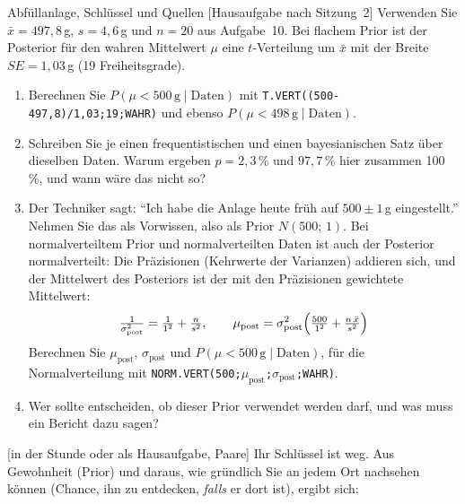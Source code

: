 \begin{uebungsblattc}{Abfüllanlage, Schlüssel und Quellen}
\newpage
{}[Hausaufgabe nach Sitzung~2]
Verwenden Sie $\bar{x}=497{,}8$\,g, $s=4{,}6$\,g und $n=20$ aus
Aufgabe~10. Bei flachem Prior ist der Posterior für den wahren
Mittelwert $\mu$ eine $t$-Verteilung um $\bar{x}$ mit der Breite
$\mathit{SE}=1{,}03$\,g (19 Freiheitsgrade).
\begin{enumerate}
  \item Berechnen Sie $P(\mu<500\,\text{g}\mid\text{Daten})$ mit
    \texttt{T.VERT((500-497,8)/1,03;19;WAHR)} und ebenso
    $P(\mu<498\,\text{g}\mid\text{Daten})$.
  \item Schreiben Sie je einen frequentistischen und einen bayesianischen
    Satz über dieselben Daten. Warum ergeben $p=2{,}3\,\%$ und
    $97{,}7\,\%$ hier zusammen 100\,\%, und wann wäre das nicht so?
  \item Der Techniker sagt: \enquote{Ich habe die Anlage heute früh
    auf $500\pm1$\,g eingestellt.} Nehmen Sie das als Vorwissen, also als
    Prior $N(500;\,1)$. Bei
    normalverteiltem Prior und normalverteilten Daten ist auch der
    Posterior normalverteilt: Die Präzisionen (Kehrwerte der Varianzen)
    addieren sich, und der Mittelwert des Posteriors ist der mit den
    Präzisionen gewichtete Mittelwert:
    \[\tfrac{1}{\sigma^2_{\text{post}}}=\tfrac{1}{1^2}+\tfrac{n}{s^2},\qquad
      \mu_{\text{post}}=\sigma^2_{\text{post}}\Bigl(\tfrac{500}{1^2}+\tfrac{n\,\bar{x}}{s^2}\Bigr)\]
    Berechnen Sie $\mu_{\text{post}}$, $\sigma_{\text{post}}$ und
    $P(\mu<500\,\text{g}\mid\text{Daten})$, für die Normalverteilung
    mit\newline
    \texttt{NORM.VERT(500;$\mu_{\text{post}}$;$\sigma_{\text{post}}$;WAHR)}.
  \item Wer sollte entscheiden, ob dieser Prior verwendet werden darf, und
    was muss ein Bericht dazu sagen?
\end{enumerate}

[in der Stunde oder als Hausaufgabe, Paare]
Ihr Schlüssel ist weg. Aus Gewohnheit (Prior) und daraus, wie gründlich
Sie an jedem Ort nachsehen können (Chance, ihn zu entdecken, \emph{falls}
er dort ist), ergibt sich:


\end{uebungsblattc}
